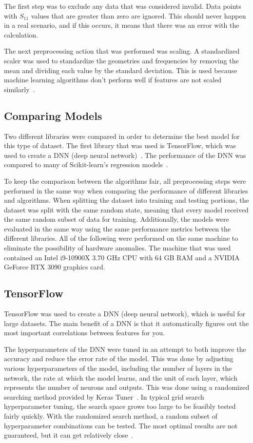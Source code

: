 \documentclass[lettersize,journal]{IEEEtran}
\begin{document}
The first step was to exclude any data that was considered invalid. Data points with $S_{11}$ values that are greater than zero are ignored. This should never happen in a real scenario, and if this occurs, it means that there was an error with the calculation. 

The next preprocessing action that was performed was scaling. A standardized scaler was used to standardize the geometries and frequencies by removing the mean and dividing each value by the standard deviation. This is used because machine learning algorithms don't perform well if features are not scaled similarly~\cite{9119820}. 


\subsection{Comparing Models}
Two different libraries were compared in order to determine the best model for this type of dataset. The first library that was used is TensorFlow, which was used to create a DNN (deep neural network)~\cite{tensorflow2015-whitepaper}. The performance of the DNN was compared to many of Scikit-learn's regression models~\cite{scikit-learn}.

To keep the comparison between the algorithms fair, all preprocessing steps were performed in the same way when comparing the performance of different libraries and algorithms. When splitting the dataset into training and testing portions, the dataset was split with the same random state, meaning that every model received the same random subset of data for training. Additionally, the models were evaluated in the same way using the same performance metrics between the different libraries. All of the following were performed on the same machine to eliminate the possibility of hardware anomalies. The machine that was used contained an Intel i9-10900X 3.70 GHz CPU with 64 GB RAM and a NVIDIA GeForce RTX 3090 graphics card. 


\subsection{TensorFlow}
TensorFlow was used to create a DNN (deep neural network), which is useful for large datasets. The main benefit of a DNN is that it automatically figures out the most important correlations between features for you. 

The hyperparameters of the DNN were tuned in an attempt to both improve the accuracy and reduce the error rate of the model. This was done by adjusting various hyperparameters of the model, including the number of layers in the network, the rate at which the model learns, and the unit of each layer, which represents the number of neurons and outputs. This was done using a randomized searching method provided by Keras Tuner~\cite{omalley2019kerastuner}. In typical grid search hyperparameter tuning, the search space grows too large to be feasibly tested fairly quickly. With the randomized search method, a random subset of hyperparameter combinations can be tested. The most optimal results are not guaranteed, but it can get relatively close~\cite{meanti_efficient_2022}. 
\end{document}
